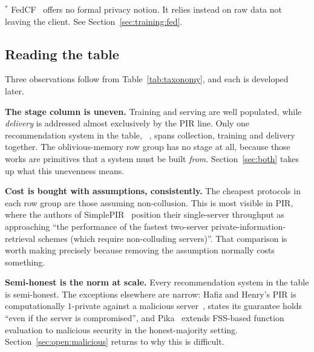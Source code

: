 \begin{table}[p]
\vspace{2pt}
\footnotesize
$^*$ FedCF~\cite{ammadudin2019} offers no formal privacy notion. It relies instead on raw data not
leaving the client. See Section~\ref{sec:training:fed}.
\end{table}

\subsection{Reading the table}
\label{sec:taxonomy:reading}

Three observations follow from Table~\ref{tab:taxonomy}, and each is developed later.

\textbf{The stage column is uneven.} Training and serving are well populated, while \emph{delivery}
is addressed almost exclusively by the PIR line. Only one recommendation system in the table,
\pirsonaplain{}~\cite{pirsona2021}, spans collection, training and delivery together. The
oblivious-memory row group has no stage at all, because those works are primitives that a system
must be built \emph{from}. Section~\ref{sec:both} takes up what this unevenness means.

\textbf{Cost is bought with assumptions, consistently.} The cheapest protocols in each row group
are those assuming non-collusion. This is most visible in PIR, where the authors of
SimplePIR~\cite{simplepir2023} position their single-server throughput as approaching ``the
performance of the fastest two-server private-information-retrieval schemes (which require
non-colluding servers)''. That comparison is worth making precisely because removing the
assumption normally costs something.

\textbf{Semi-honest is the norm at scale.} Every recommendation system in the table is
semi-honest. The exceptions elsewhere are narrow: Hafiz and Henry's PIR is computationally
$1$-private against a malicious server~\cite{hafiz2019}, \compass{} states its guarantee holds
``even if the server is compromised'', and Pika~\cite{pika2022} extends FSS-based function
evaluation to malicious security in the honest-majority setting. Section~\ref{sec:open:malicious}
returns to why this is difficult.
